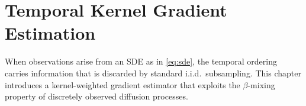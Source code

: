 \chapter{Temporal Kernel Gradient Estimation}

When observations arise from an SDE as in \eqref{eq:sde}, the temporal ordering carries information that is discarded by standard i.i.d.\ subsampling. This chapter introduces a kernel-weighted gradient estimator that exploits the $\beta$-mixing property of discretely observed diffusion processes.
